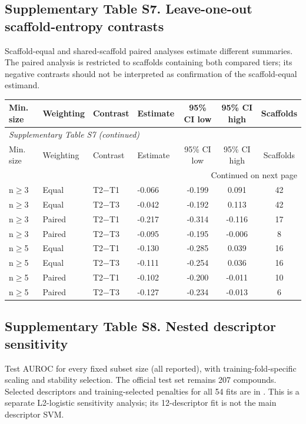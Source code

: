 \subsection*{Supplementary Table S7. Leave-one-out scaffold-entropy contrasts}
Scaffold-equal and shared-scaffold paired analyses estimate different summaries. The paired analysis is restricted to scaffolds containing both compared tiers; its negative contrasts should not be interpreted as confirmation of the scaffold-equal estimand.
\begin{longtable}{llllccc}

\toprule Min. size & Weighting & Contrast & Estimate & 95\% CI low & 95\% CI high & Scaffolds \\ \midrule\endfirsthead
\multicolumn{7}{l}{\textit{Supplementary Table S7 (continued)}} \\
\toprule Min. size & Weighting & Contrast & Estimate & 95\% CI low & 95\% CI high & Scaffolds \\ \midrule\endhead
\midrule\multicolumn{7}{r}{Continued on next page}\\\endfoot
\bottomrule\endlastfoot
n$\geq$3 & Equal & T2$-$T1 & -0.066 & -0.199 & 0.091 & 42 \\
n$\geq$3 & Equal & T2$-$T3 & -0.042 & -0.192 & 0.113 & 42 \\
n$\geq$3 & Paired & T2$-$T1 & -0.217 & -0.314 & -0.116 & 17 \\
n$\geq$3 & Paired & T2$-$T3 & -0.095 & -0.195 & -0.006 & 8 \\
n$\geq$5 & Equal & T2$-$T1 & -0.130 & -0.285 & 0.039 & 16 \\
n$\geq$5 & Equal & T2$-$T3 & -0.111 & -0.254 & 0.036 & 16 \\
n$\geq$5 & Paired & T2$-$T1 & -0.102 & -0.200 & -0.011 & 10 \\
n$\geq$5 & Paired & T2$-$T3 & -0.127 & -0.234 & -0.013 & 6 \\
\end{longtable}

\subsection*{Supplementary Table S8. Nested descriptor sensitivity}

Test AUROC for every fixed subset size (all reported), with training-fold-specific scaling and stability selection. The official test set remains 207 compounds. Selected descriptors and training-selected penalties for all 54 fits are in . This is a separate L2-logistic sensitivity analysis; its 12-descriptor fit is not the main descriptor SVM.


